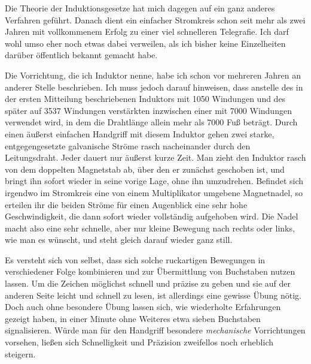 Die Theorie der Induktionsgesetze hat mich dagegen auf ein ganz anderes Verfahren geführt. Danach dient ein einfacher Stromkreis schon seit mehr als zwei Jahren mit vollkommenem Erfolg zu einer viel schnelleren Telegrafie. Ich darf wohl umso eher noch etwas dabei verweilen, als ich bisher keine Einzelheiten darüber öffentlich bekannt gemacht habe.

Die Vorrichtung, die ich Induktor nenne, habe ich schon vor mehreren Jahren an anderer Stelle beschrieben{\renewcommand{\thefootnote}{**)}}. Ich muss jedoch darauf hinweisen, dass anstelle des in der ersten Mitteilung beschriebenen Induktors mit 1050 Windungen und des später auf 3537 Windungen verstärkten inzwischen einer mit 7000 Windungen verwendet wird, in dem die Drahtlänge allein mehr als 7000 Fuß beträgt. Durch einen äußerst einfachen Handgriff mit diesem Induktor gehen zwei starke, entgegengesetzte galvanische Ströme rasch nacheinander durch den Leitungsdraht. Jeder dauert nur äußerst kurze Zeit. Man zieht den Induktor rasch von dem doppelten Magnetstab ab, über den er zunächst geschoben ist, und bringt ihn sofort wieder in seine vorige Lage, ohne ihn umzudrehen. Befindet sich irgendwo im Stromkreis eine von einem Multiplikator umgebene Magnetnadel, so erteilen ihr die beiden Ströme für einen Augenblick eine sehr hohe Geschwindigkeit, die dann sofort wieder vollständig aufgehoben wird. Die Nadel macht also eine sehr schnelle, aber nur kleine Bewegung nach rechts oder links, wie man es wünscht, und steht gleich darauf wieder ganz still.

Es versteht sich von selbst, dass sich solche ruckartigen Bewegungen in verschiedener Folge kombinieren und zur Übermittlung von Buchstaben nutzen lassen. Um die Zeichen möglichst schnell und präzise zu geben und sie auf der anderen Seite leicht und schnell zu lesen, ist allerdings eine gewisse Übung nötig. Doch auch ohne besondere Übung lassen sich, wie wiederholte Erfahrungen gezeigt haben, in einer Minute ohne Weiteres etwa sieben Buchstaben signalisieren. Würde man für den Handgriff besondere \textit{mechanische} Vorrichtungen vorsehen, ließen sich Schnelligkeit und Präzision zweifellos noch erheblich steigern.

